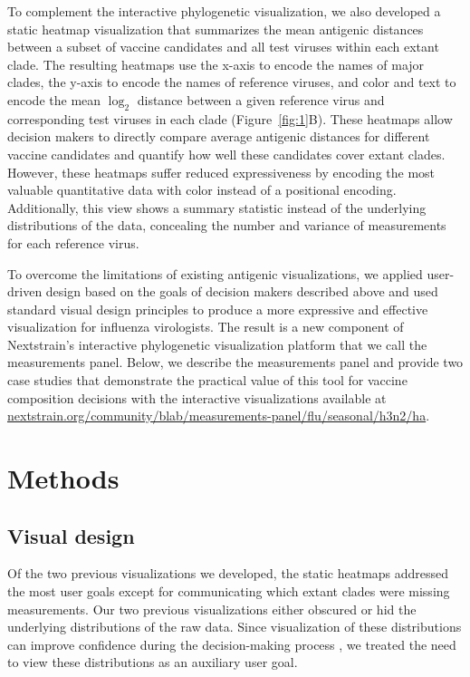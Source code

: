 \documentclass[utf8]{FrontiersinHarvard} %
\begin{document}
To complement the interactive phylogenetic visualization, we also developed a static heatmap visualization that summarizes the mean antigenic distances between a subset of vaccine candidates and all test viruses within each extant clade.
The resulting heatmaps use the x-axis to encode the names of major clades, the y-axis to encode the names of reference viruses, and color and text to encode the mean $\log_{2}$ distance between a given reference virus and corresponding test viruses in each clade (Figure~\ref{fig:1}B).
These heatmaps allow decision makers to directly compare average antigenic distances for different vaccine candidates and quantify how well these candidates cover extant clades.
However, these heatmaps suffer reduced expressiveness by encoding the most valuable quantitative data with color instead of a positional encoding.
Additionally, this view shows a summary statistic instead of the underlying distributions of the data, concealing the number and variance of measurements for each reference virus.

To overcome the limitations of existing antigenic visualizations, we applied user-driven design based on the goals of decision makers described above and used standard visual design principles to produce a more expressive and effective visualization for influenza virologists.
The result is a new component of Nextstrain's interactive phylogenetic visualization platform that we call the measurements panel.
Below, we describe the measurements panel and provide two case studies that demonstrate the practical value of this tool for vaccine composition decisions with the interactive visualizations available at \href{https://nextstrain.org/community/blab/measurements-panel/flu/seasonal/h3n2/ha}{nextstrain.org/community/blab/measurements-panel/flu/seasonal/h3n2/ha}.

\section{Methods}

\subsection{Visual design}

Of the two previous visualizations we developed, the static heatmaps addressed the most user goals except for communicating which extant clades were missing measurements.
Our two previous visualizations either obscured or hid the underlying distributions of the raw data.
Since visualization of these distributions can improve confidence during the decision-making process \citep{correll2014error,Hullman2015,Fernandes2018}, we treated the need to view these distributions as an auxiliary user goal.
\end{document}
